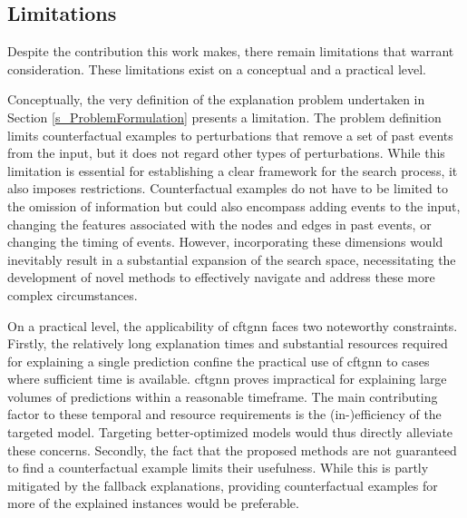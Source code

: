 \subsection{Limitations}
\label{s_Conclusion_Limitations}

Despite the contribution this work makes, there remain limitations that warrant consideration. These limitations exist on a conceptual and a practical level.

Conceptually, the very definition of the explanation problem undertaken in Section \ref{s_ProblemFormulation} presents a limitation. The problem definition limits counterfactual examples to perturbations that remove a set of past events from the input, but it does not regard other types of perturbations. While this limitation is essential for establishing a clear framework for the search process, it also imposes restrictions. Counterfactual examples do not have to be limited to the omission of information but could also encompass adding events to the input, changing the features associated with the nodes and edges in past events, or changing the timing of events. However, incorporating these dimensions would inevitably result in a substantial expansion of the search space, necessitating the development of novel methods to effectively navigate and address these more complex circumstances.

On a practical level, the applicability of \gls{cftgnn} faces two noteworthy constraints. Firstly, the relatively long explanation times and substantial resources required for explaining a single prediction confine the practical use of \gls{cftgnn} to cases where sufficient time is available. \gls{cftgnn} proves impractical for explaining large volumes of predictions within a reasonable timeframe. The main contributing factor to these temporal and resource requirements is the (in-)efficiency of the targeted model. Targeting better-optimized models would thus directly alleviate these concerns. Secondly, the fact that the proposed methods are not guaranteed to find a counterfactual example limits their usefulness. While this is partly mitigated by the fallback explanations, providing counterfactual examples for more of the explained instances would be preferable.





